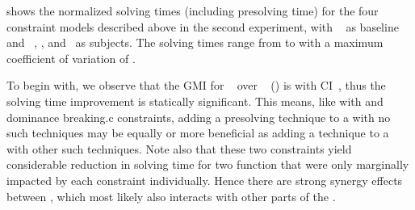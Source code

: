  shows the normalized solving
times (including presolving time) for the four \glspl{constraint model}
described above in the second experiment, with ~\modelC{} as \gls{baseline} and ~\modelD,
\modelE, and~\modelF{} as \glspl{subject}.
%
The solving times range from
\printMinSolvingTime{
  \SolvTechEnableOnlyGoodPresolvingPrePlusSolvingTimeSpeedupNonePrePlusSolvingTimeAvgMin,
  \SolvTechEnableOnlyGoodPresolvingPrePlusSolvingTimeSpeedupPrePlusSolvingTimeAvgMin,
  \SolvTechDisableBadPresolvingPrePlusSolvingTimeSpeedupPrePlusSolvingTimeAvgMin,
  \SolvTechDisableAllPresolvingPrePlusSolvingTimeSpeedupPrePlusSolvingTimeAvgMin
} to
\printMaxSolvingTime{
  \SolvTechEnableOnlyGoodPresolvingPrePlusSolvingTimeSpeedupNonePrePlusSolvingTimeAvgMax,
  \SolvTechEnableOnlyGoodPresolvingPrePlusSolvingTimeSpeedupPrePlusSolvingTimeAvgMax,
  \SolvTechDisableBadPresolvingPrePlusSolvingTimeSpeedupPrePlusSolvingTimeAvgMax,
  \SolvTechDisableAllPresolvingPrePlusSolvingTimeSpeedupPrePlusSolvingTimeAvgMax
} with a maximum coefficient of variation of
\numMaxOf{
  \SolvTechEnableOnlyGoodPresolvingPrePlusSolvingTimeSpeedupNonePrePlusSolvingTimeCvMax,
  \SolvTechEnableOnlyGoodPresolvingPrePlusSolvingTimeSpeedupPrePlusSolvingTimeCvMax,
  \SolvTechDisableBadPresolvingPrePlusSolvingTimeSpeedupPrePlusSolvingTimeCvMax,
  \SolvTechDisableAllPresolvingPrePlusSolvingTimeSpeedupPrePlusSolvingTimeCvMax
}.

To begin with, we observe that the \gls{GMI} for ~\modelD{} over ~\modelC{}
() is \printGMI{%
  \SolvTechEnableOnlyGoodPresolvingPrePlusSolvingTimeSpeedupPrePlusSolvingTimeRegularSpeedupGmean%
} with \gls{CI}~\printGMICI{%
  \SolvTechEnableOnlyGoodPresolvingPrePlusSolvingTimeSpeedupPrePlusSolvingTimeRegularSpeedupCiMin%
}{%
  \SolvTechEnableOnlyGoodPresolvingPrePlusSolvingTimeSpeedupPrePlusSolvingTimeRegularSpeedupCiMax%
}, thus the solving time improvement is statically significant.
%
This means, like with  and \gls{dominance
  breaking.c} \glspl{constraint}, adding a \gls{presolving} technique to a
 with no such techniques may be equally or more
beneficial as adding a technique to a  with other
such techniques.
%
Note also that these two \glspl{constraint} yield considerable reduction in
solving time for two \gls{function} that were only marginally impacted by each
\gls{constraint} individually.
%
Hence there are strong synergy effects between , which most likely also interacts with other
parts of the .

